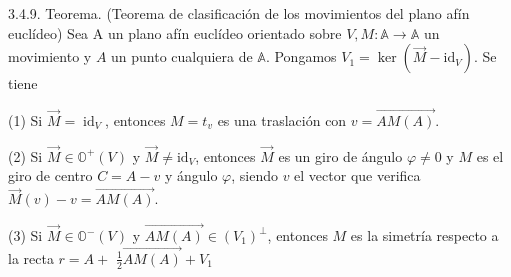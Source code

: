 \documentclass[12pt, a4paper, ones, notitlepage, openany,titlepage]{article}
\begin{document}
3.4.9. Teorema. (Teorema de clasificación de los movimientos del plano afín euclídeo) Sea A un plano afín euclídeo orientado sobre $V, M: \mathbb{A} \rightarrow \mathbb{A}$ un movimiento y $A$ un punto cualquiera de $\mathbb{A}$. Pongamos $V_{1}=\ker\left(\vec{M}-\mathrm{id}_{V}\right)$. Se tiene

(1) Si $\vec{M}=\operatorname{id}_{V}$, entonces $M=t_{v}$ es una traslación con $v=\overrightarrow{A M(A)}$.

(2) Si $\vec{M} \in \mathbb{O}^{+}(V)$ y $\vec{M} \neq \mathrm{id}_{V}$, entonces $\vec{M}$ es un giro de ángulo $\varphi \neq 0$ y $M$ es el giro de centro $C=A-v$ y ángulo $\varphi$, siendo $v$ el vector que verifica $\vec{M}(v)-v=\overrightarrow{A M(A)}$.

(3) Si $\vec{M} \in \mathbb{O}^{-}(V)$ y $\overrightarrow{A M(A)} \in\left(V_{1}\right)^{\perp}$, entonces $M$ es la simetría respecto a la recta $r=A+$ $\frac{1}{2} \overrightarrow{A M(A)}+V_{1}$
\end{document}
